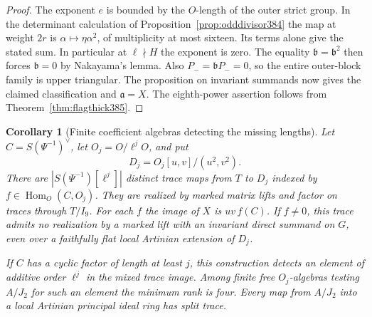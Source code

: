 \documentclass[a4paper,11pt]{article}
\newtheorem{corollary}[proposition]{Corollary}
\theoremstyle{definition}
\theoremstyle{remark}
\numberwithin{equation}{section}
\begin{document}
\begin{proof}
The exponent \(e\) is bounded by the \(O\)-length of the outer
strict group. In the determinant calculation of
Proposition~\ref{prop:odddivisor384} the map at weight \(2r\)
is \(\alpha\mapsto\eta\alpha^2\), of multiplicity at most
sixteen. Its terms alone give the stated sum. In particular
at \(\ell\nmid H\) the exponent is zero. The equality
\(\mathfrak b=\mathfrak b^2\) then forces \(\mathfrak b=0\)
by Nakayama's lemma. Also \(P_-=\mathfrak bP_-=0\), so the
entire outer-block family is upper triangular. The proposition
on invariant summands now gives the claimed classification
and \(\mathfrak a=X\). The eighth-power assertion follows
from Theorem~\ref{thm:flagthick385}.
\end{proof}

\begin{corollary}[Finite coefficient algebras detecting the missing lengths]
\label{cor:fourcoeff385}
Let \(C=S(\Psi^{-1})^\vee\), let \(O_j=O/\ell^jO\), and put
\[
         D_j=O_j[u,v]/(u^2,v^2).
\]
There are \(|S(\Psi^{-1})[\ell^j]|\) distinct trace maps from
\(T\) to \(D_j\) indexed by \(f\in\operatorname{Hom}_O(C,O_j)\).
They are realized by marked matrix lifts and factor on traces
through \(T/I_9\). For each \(f\) the image of \(X\) is
\(uv\, f(C)\). If \(f\ne0\), this trace admits no realization
by a marked lift with an invariant direct summand on \(G\), even
over a faithfully flat local Artinian extension of \(D_j\).

If \(C\) has a cyclic factor of length at least \(j\), this
construction detects an element of additive order \(\ell^j\)
in the mixed trace image. Among finite free \(O_j\)-algebras
testing \(A/J_2\) for such an element the minimum rank is four.
Every map from \(A/J_2\) into a local Artinian principal ideal
ring has split trace.
\end{corollary}
\end{document}
